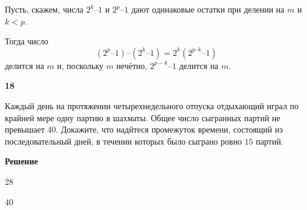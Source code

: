 \documentclass{article}
\begin{document}
Пусть, скажем, числа  $2^k – 1$  и  $2^p – 1$  дают одинаковые остатки при делении на $m$ и  $k < p$.  

Тогда число  $$(2^p – 1) – (2^k – 1) = 2^k(2^{p–k} – 1)$$  делится на $m$ и, поскольку $m$ нечётно,  $2^{p - k} – 1$  делится на $m$.


\newpage

\textbf{18}

Каждый день на протяжении четырехнедельного отпуска отдыхающий играл по крайней мере одну партию в шахматы. Общее число сыгранных партий не превышает $40$. Докажите, что надйтеся промежуток времени, состоящий из последовательный дней, в течении которых было сыграно ровно  $15 $ партий. 

\textbf{Решение}


28 

40 
\end{document}
